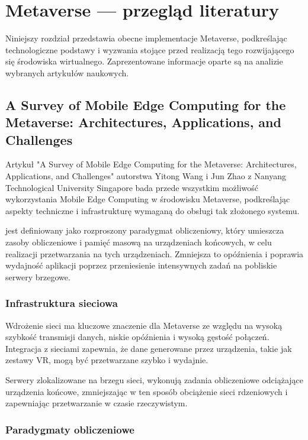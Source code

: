 \chapter{Metaverse --- przegląd literatury}

Niniejszy rozdział przedstawia obecne implementacje Metaverse, podkreślając technologiczne podstawy i wyzwania stojące przed realizacją tego rozwijającego się środowiska wirtualnego. Zaprezentowane informacje oparte są na analizie wybranych artykułów naukowych.

\section{A Survey of Mobile Edge Computing for the
Metaverse: Architectures, Applications, and
Challenges}

Artykuł "A Survey of Mobile Edge Computing for the Metaverse: Architectures, Applications, and Challenges" autorstwa Yitong Wang i Jun Zhao z Nanyang Technological University Singapore bada przede wszystkim możliwość wykorzystania Mobile Edge Computing  w środowisku Metaverse, podkreślając aspekty techniczne i infrastrukturę wymaganą do obsługi tak złożonego systemu.

 jest definiowany jako rozproszony paradygmat obliczeniowy, który umieszcza zasoby obliczeniowe i pamięć masową na urządzeniach końcowych, w celu realizacji przetwarzania na tych urządzeniach. Zmniejsza to opóźnienia i poprawia wydajność aplikacji poprzez przeniesienie intensywnych zadań na pobliskie serwery brzegowe.

\subsection{Infrastruktura sieciowa}

Wdrożenie sieci  ma kluczowe znaczenie dla Metaverse ze względu na wysoką szybkość transmisji danych, niskie opóźnienia i wysoką gęstość połączeń. Integracja  z sieciami  zapewnia, że dane generowane przez urządzenia, takie jak zestawy VR, mogą być przetwarzane szybko i wydajnie.

Serwery zlokalizowane na brzegu sieci, wykonują zadania obliczeniowe odciążające urządzenia końcowe, zmniejszając w ten sposób obciążenie sieci rdzeniowych i zapewniając przetwarzanie w czasie rzeczywistym.

\subsection{Paradygmaty obliczeniowe}

